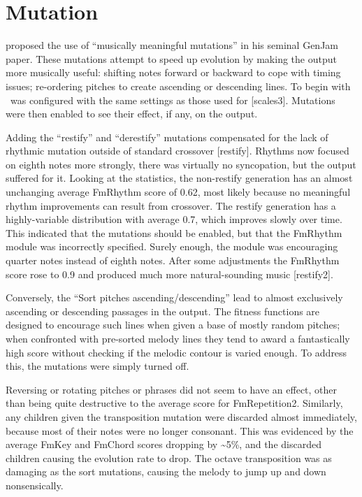 \section{Mutation}

\cite{biles94} proposed the use of ``musically meaningful mutations'' in his seminal GenJam paper. These mutations attempt to speed up evolution by making the output more musically useful: shifting notes forward or backward to cope with timing issues; re-ordering pitches to create ascending or descending lines. To begin with \jg\ was configured with the same settings as those used for [scales3]. Mutations were then enabled to see their effect, if any, on the output.

Adding the ``restify'' and ``derestify'' mutations compensated for the lack of rhythmic mutation outside of standard crossover [restify]. Rhythms now focused on eighth notes more strongly, there was virtually no syncopation, but the output suffered for it. Looking at the statistics, the non-restify generation has an almost unchanging average FmRhythm score of 0.62, most likely because no meaningful rhythm improvements can result from crossover. The restify generation has a highly-variable distribution with average 0.7, which improves slowly over time. This indicated that the mutations should be enabled, but that the FmRhythm module was incorrectly specified. Surely enough, the module was encouraging quarter notes instead of eighth notes. After some adjustments the FmRhythm score rose to 0.9 and produced much more natural-sounding music [restify2].

Conversely, the ``Sort pitches ascending/descending'' lead to almost exclusively ascending or descending passages in the output. The fitness functions are designed to encourage such lines when given a base of mostly random pitches; when confronted with pre-sorted melody lines they tend to award a fantastically high score without checking if the melodic contour is varied enough. To address this, the mutations were simply turned off.

Reversing or rotating pitches or phrases did not seem to have an effect, other than being quite destructive to the average score for FmRepetition2. Similarly, any children given the transposition mutation were discarded almost immediately, because most of their notes were no longer consonant. This was evidenced by the average FmKey and FmChord scores dropping by \~{}5\%, and the discarded children causing the evolution rate to drop. The octave transposition was as damaging as the sort mutations, causing the melody to jump up and down nonsensically.

